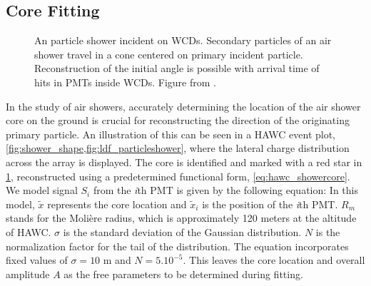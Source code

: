 \subsection{Core Fitting} \label{sec:hawc_core_fitting}

\begin{figure}[h!]
    \caption{An particle shower incident on WCDs. Secondary particles of an air shower travel in a cone centered on primary incident particle. Reconstruction of the initial angle is possible with arrival time of hits in PMTs inside WCDs. Figure from \cite{thesis_Zigg}.}
    \label{fig:shower_shape}
\end{figure}

In the study of air showers, accurately determining the location of the air shower core on the ground is crucial for reconstructing the direction of the originating primary particle.
An illustration of this can be seen in a HAWC event plot, \cref{fig:shower_shape,fig:ldf_particleshower}, where the lateral charge distribution across the array is displayed.
The core is identified and marked with a red star in \cref{fig:shower_shape}, reconstructed using a predetermined functional form, \cref{eq:hawc_showercore}.
We model signal $S_i$ from the \textit{i}th PMT is given by the following equation:
\showercore
In this model, $\tilde{x}$ represents the core location and $\tilde{x}_i$ is the position of the \textit{i}th PMT.
$R_m$ stands for the Molière radius, which is approximately 120 meters at the altitude of HAWC.
$\sigma$ is the standard deviation of the Gaussian distribution.
$N$ is the normalization factor for the tail of the distribution.
The equation incorporates fixed values of $\sigma = 10$ m and $N=5.10^{-5}$.
This leaves the core location and overall amplitude $A$ as the free parameters to be determined during fitting.

